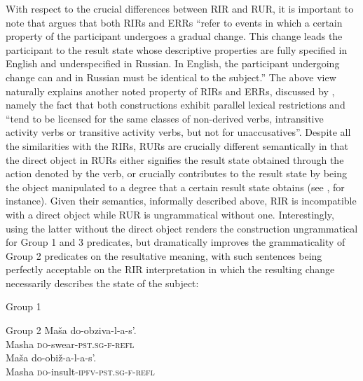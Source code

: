 \documentclass[output=paper,colorlinks,citecolor=brown,modfonts,nonflat]{langsci/langscibook}
\begin{document}
With respect to the crucial differences between RIR and RUR, it is important to note that \citet{Tatevosov2010} argues that both RIRs and ERRs “refer to events in which a certain property of the participant undergoes a gradual change. This change leads the participant to the result state whose descriptive properties are fully specified in English and underspecified in Russian. In English, the participant undergoing change can and in Russian must be identical to the subject.” The above view naturally explains another noted property of RIRs and ERRs, discussed by \citeauthor{Tatevosov2010}, namely the fact that both constructions exhibit parallel lexical restrictions and “tend to be licensed for the same classes of non-derived verbs, intransitive activity verbs or transitive activity verbs, but not for unaccusatives”. Despite all the similarities with the RIRs, RURs are crucially different semantically in that the direct object in RURs either signifies the result state obtained through the action denoted by the verb, or crucially contributes to the result state by being the object manipulated to a degree that a certain result state obtains (see , for instance). Given their semantics, informally described above, RIR is incompatible with a direct object while RUR is ungrammatical without one. Interestingly, using the latter without the direct object renders the construction ungrammatical for Group 1 and 3 predicates, but dramatically improves the grammaticality of Group 2 predicates on the resultative meaning, with such sentences being perfectly acceptable on the RIR interpretation in which the resulting change necessarily describes the state of the subject:


\ea%
    \label{ex:antonyuk:44}
     {Group 1}
    \z
\z

\ea%
    \label{ex:antonyuk:45}
     {Group 2}
    \ea \label{ex:antonyuk:45a}
    \gll    Maša do-obziva-l-a-s’.\\
            Masha \textsc{do-}swear\textsc{-pst.sg-f-refl}\\
    \ex \label{ex:antonyuk:45b}
    \gll    Maša do-obiž-a-l-a-s’.\\
            Masha \textsc{do-}insult\textsc{-ipfv-pst.sg-f-refl}\\
    \z
\z
\end{document}
